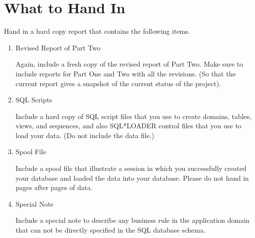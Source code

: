 \documentclass[11pt]{article}
\begin{document}
\section*{What to Hand In}
\label{sec-2}


  Hand in a hard copy report that contains the following items.

\begin{enumerate}
\item Revised Report of Part Two
     
     Again, include a fresh copy of the revised report of Part
     Two. Make sure to include reports for Part One and Two with all
     the revisions. (So that the current report gives a snapshot of
     the current status of the project).
\item SQL Scripts 

     Include a hard copy of SQL script files that you use to create
     domains, tables, views, and sequences, and also SQL*LOADER
     control files that you use to load your data. (Do not include the
     data file.)
\item Spool File
     
     Include a spool file that illustrate a session in which you
     successfully created your database and loaded the data into your
     database. Please do not hand in pages after pages of data.
\item Special Note
     
     Include a special note to describe any business rule in the
     application domain that can not be directly specified in the SQL
     database schema.
\end{enumerate}
\end{document}
